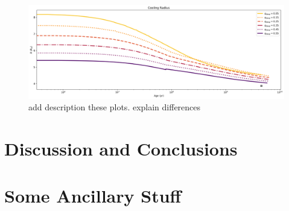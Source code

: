 \documentclass[11pt]{ucscthesisbs}
\begin{document}
\begin{figure}[ht]
 \centerline{
  \includegraphics[scale=0.5]{figures/n_cooling_radius_nz_4096_logx.png}
 }
\caption[Inhibition of convection on Uranus]
{add description these plots. explain differences}
\label{fig:radiative}
\end{figure}




\chapter{Discussion and Conclusions}





\appendix
\chapter{Some Ancillary Stuff}

\newcommand{\newblock}{}

\end{document}
